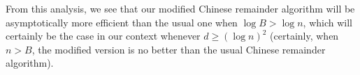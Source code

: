 \documentclass{amsart}
\newcommand{\Z}{{\bf{Z}}}
\newcommand{\HH}{\mathcal{H}}
\newcommand{\noi}{\noindent}
\theoremstyle{plain}
\begin{document}
From this analysis, we see that our modified Chinese remainder 
algorithm will be asymptotically more efficient than the usual one 
when $\log B > \log n $, which will certainly be the case in our context 
whenever $d \ge (\log n)^2$ (certainly, when $n > B$, the modified
version is no better than the usual Chinese remainder algorithm). 


%
%



\end{document}
